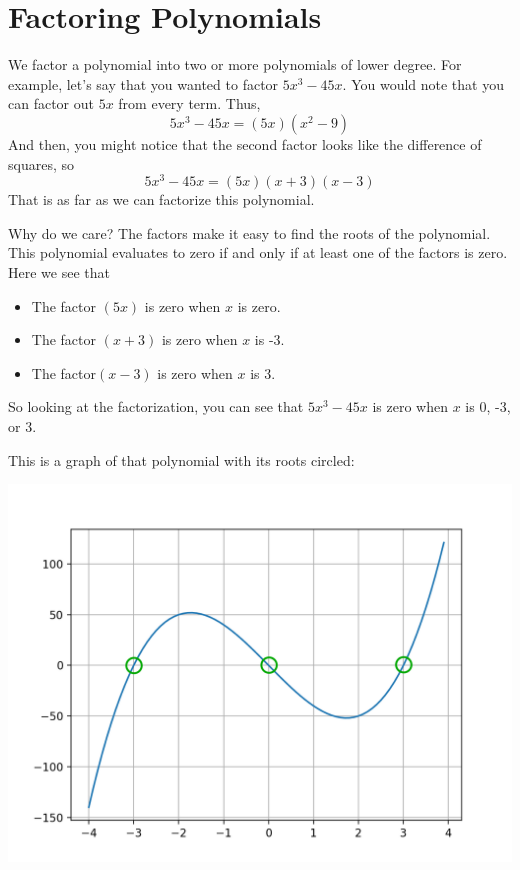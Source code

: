 \chapter{Factoring Polynomials}

We factor a polynomial into two or more polynomials of lower
degree. For example, let's say that you wanted to factor
$5x^3 - 45x$. You would note that you can factor out $5x$ from every term. Thus,
\begin{equation*}
5x^3 - 45x = (5x)(x^2 - 9)
\end{equation*}
And then, you might notice that the second factor looks like the difference of squares, so
\begin{equation*}
5x^3 - 45x = (5x)(x + 3)(x - 3)
\end{equation*}
That is as far as we can factorize this polynomial.

Why do we care? The factors make it easy to find the roots of the
polynomial. This polynomial evaluates to zero if and only if at least
one of the factors is zero. Here we see that
\begin{itemize}
\item The factor $(5x)$ is zero when $x$ is zero.
\item The factor $(x + 3)$ is zero when $x$ is -3.
\item The factor$(x - 3)$ is zero when $x$ is 3.
\end{itemize}
So looking at the factorization, you can see
that $5x^3 - 45x$ is zero when $x$ is 0, -3, or 3. 

This is a graph of that polynomial with its roots circled:

\includegraphics{factor4roots}

